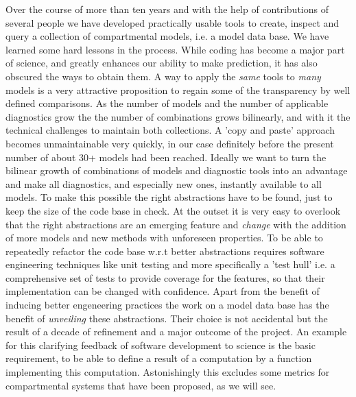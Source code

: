 Over the course of more than ten years and with the help of contributions of
several people we have developed  practically usable tools to create, inspect
and query a collection of compartmental models, i.e. a model data base.  We
have learned some hard lessons in the process.  While coding has become a major
part of science, and greatly enhances our ability to make prediction, it has also
obscured the ways to obtain them.  A way to apply the \emph{same} tools to
\emph{many} models is a very attractive proposition to regain some of the
transparency by well defined comparisons.  As the number of models and the
number of applicable diagnostics grow the the number of combinations grows
bilinearly, and with it the technical challenges to maintain both collections.
A 'copy and paste' approach becomes unmaintainable very quickly, in our case
definitely before the present number of about 30+ models had been reached.
Ideally we want to turn the bilinear growth of combinations of models and
diagnostic tools into an advantage and make all diagnostics, and especially new ones, instantly
available to all models.  To make this possible the right abstractions have to be found, just to
keep the size of the code base in check.  At the outset it is very easy to
overlook that the right abstractions are an emerging feature and \emph{change}
with the addition of more models and new methods with unforeseen properties.  To
be able to repeatedly refactor the code base w.r.t better abstractions requires
software engineering techniques like unit testing and more specifically a 'test
hull' i.e. a comprehensive set of tests to provide coverage for the
features, so that their implementation can be changed with confidence.  Apart
from the benefit of inducing better engeneering practices the work on a model
data base has the benefit of \emph{unveiling} these abstractions.  Their choice
is not accidental but the result of a decade of refinement and a major outcome
of the project.  An example for this clarifying feedback of software
development to science is  the basic requirement, to be able to  define  a
result of a computation by a function implementing this computation.
Astonishingly this excludes some metrics for compartmental systems that have
been proposed, as we will see.

